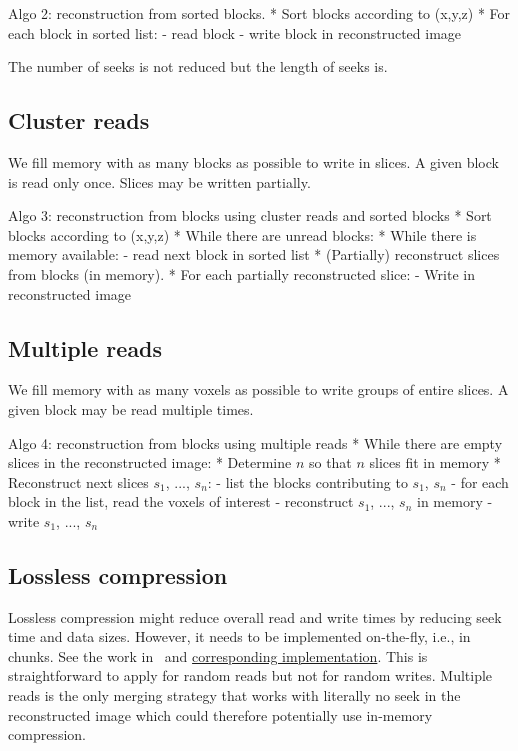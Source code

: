 \documentclass[10pt, conference, compsocconf]{IEEEtran}
\begin{document}
Algo 2: reconstruction from sorted blocks.
* Sort blocks according to (x,y,z)
* For each block in sorted list:
  - read block
  - write block in reconstructed image

The number of seeks is not reduced but the length of seeks is.

\subsection{Cluster reads}

We fill memory with as many blocks as possible to write in slices. A
given block is read only once. Slices may be written partially.

Algo 3: reconstruction from blocks using cluster reads and sorted blocks
* Sort blocks according to (x,y,z)
* While there are unread blocks:
  * While there is memory available:
    - read next block in sorted list
  * (Partially) reconstruct slices from blocks (in memory).
  * For each partially reconstructed slice:
    - Write in reconstructed image

\subsection{Multiple reads}

We fill memory with as many voxels as possible to write groups of
entire slices. A given block may be read multiple times.

Algo 4: reconstruction from blocks using multiple reads
* While there are empty slices in the reconstructed image:
  * Determine $n$ so that $n$ slices fit in memory
  * Reconstruct next slices $s_1$, ...,  $s_n$:
     - list the blocks contributing to $s_1$, $s_n$
     - for each block in the list, read the voxels of interest
     - reconstruct $s_1$, ..., $s_n$ in memory
     - write $s_1$, ..., $s_n$

\subsection{Lossless compression}
     
Lossless compression might reduce overall read and write times by
reducing seek time and data sizes. However, it needs to be implemented
on-the-fly, i.e., in chunks. See the work in~\cite{rajna2015speeding}
and
\href{https://github.com/pauldmccarthy/indexed\_gzip}{corresponding
  implementation}. This is straightforward to apply for random reads
but not for random writes. Multiple reads is the only merging strategy
that works with literally no seek in the reconstructed image which
could therefore potentially use in-memory compression.
     
\end{document}
